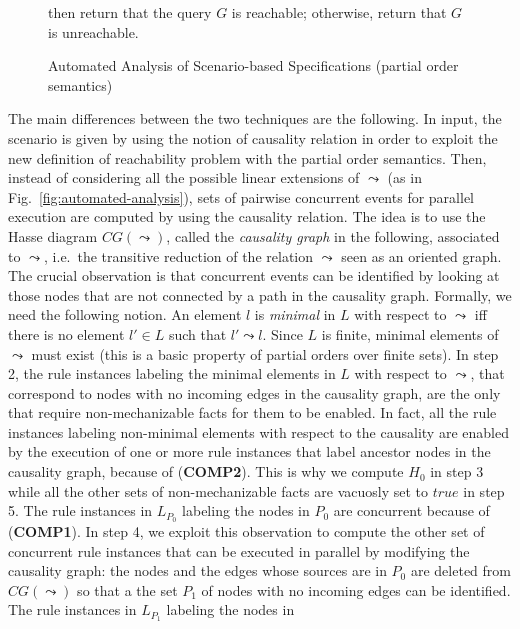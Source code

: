 \documentclass[conference]{llncs}
\begin{document}
{\begin{figure}[t]
\begin{minipage}{\textwidth}
\begin{enumerate}
  then return that the query $G$ is reachable; otherwise, return that
  $G$ is unreachable.
\end{enumerate}
\end{minipage}
\caption{\label{fig:automated-analysis-refinement}Automated Analysis of Scenario-based Specifications (partial order semantics)}
\end{figure}
The main differences between the two techniques are the following.  In
input, the scenario is given by using the notion of causality relation
in order to exploit the new definition of reachability problem with
the partial order semantics.  Then, instead of considering all the
possible linear extensions of $\leadsto$ (as in
Fig.~\ref{fig:automated-analysis}), sets of pairwise concurrent events
for parallel execution are computed by using the causality relation.
The idea is to use the Hasse diagram $CG(\leadsto)$, called the
\emph{causality graph} in the following, associated to $\leadsto$,
i.e.\ the transitive reduction of the relation $\leadsto$ seen as an
oriented graph.  The crucial observation is that concurrent events can
be identified by looking at those nodes that are not connected by a
path in the causality graph.  Formally, we need the following notion.
An element $l$ is \emph{minimal} in $L$ with respect to $\leadsto$ iff
there is no element $l'\in L$ such that $l'\leadsto l$.  Since $L$ is
finite, minimal elements of $\leadsto$ must exist (this is a basic
property of partial orders over finite sets).  In step 2, the rule
instances labeling the minimal elements in $L$ with respect to
$\leadsto$, that correspond to nodes with no incoming edges in the
causality graph, are the only that require non-mechanizable facts for
them to be enabled.  In fact, all the rule instances labeling
non-minimal elements with respect to the causality are enabled by the
execution of one or more rule instances that label ancestor nodes in
the causality graph, because of (\textbf{COMP2}).  This is why we
compute $H_0$ in step 3 while all the other sets of non-mechanizable
facts are vacuosly set to $\mathit{true}$ in step 5.  The rule
instances in $L_{P_0}$ labeling the nodes in $P_0$ are concurrent
because of (\textbf{COMP1}).  In step 4, we exploit this observation
to compute the other set of concurrent rule instances that can be
executed in parallel by modifying the causality graph: the nodes and
the edges whose sources are in $P_0$ are deleted from $CG(\leadsto)$
so that a the set $P_1$ of nodes with no incoming edges can be
identified.  The rule instances in $L_{P_1}$ labeling the nodes in
}
\end{document}
